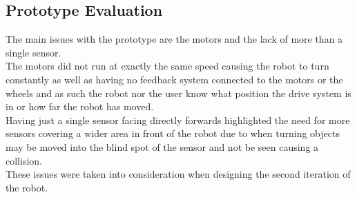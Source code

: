 \subsection{Prototype Evaluation}
The main issues with the prototype are the motors and the lack of more than a single sensor.
\\The motors did not run at exactly the same speed causing the robot to turn constantly as well as having no feedback system connected to the motors or the wheels and as such the robot nor the user know what position the drive system is in or how far the robot has moved.
\\Having just a single sensor facing directly forwards highlighted the need for more sensors covering a wider area in front of the robot due to when turning objects may be moved into the blind spot of the sensor and not be seen causing a collision.
\\These issues were taken into consideration when designing the second iteration of the robot.


